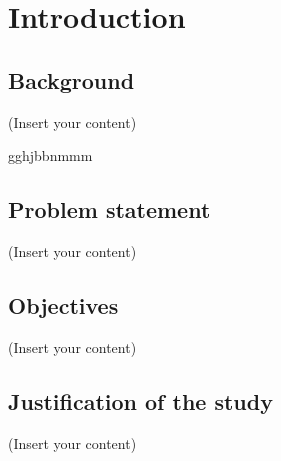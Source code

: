 \section{Introduction}
\label{sec:introduction}
\subsection{Background}
(Insert your content)

gghjbbnmmm

\subsection{Problem statement}
(Insert your content)
\subsection{Objectives}
(Insert your content)
\subsection{Justification of the study}
(Insert your content)